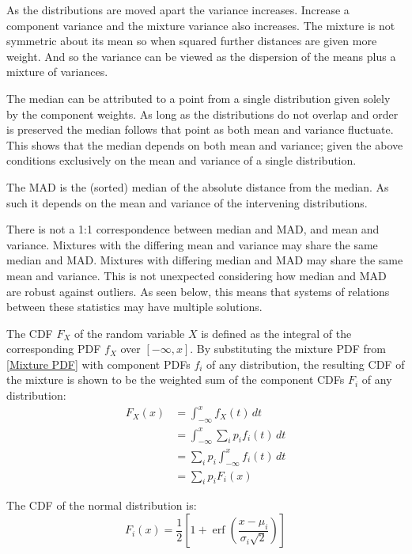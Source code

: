 \documentclass{article}
\DeclareMathOperator\erf{erf}
\begin{document}
As the distributions are moved apart the variance increases. Increase a component variance and the mixture variance also increases. The mixture is not symmetric about its mean so when squared further distances are given more weight. And so the variance can be viewed as the dispersion of the means plus a mixture of variances.

The median can be attributed to a point from a single distribution given solely by the component weights. As long as the distributions do not overlap and order is preserved the median follows that point as both mean and variance fluctuate. This shows that the median depends on both mean and variance; given the above conditions exclusively on the mean and variance of a single distribution.

The MAD is the (sorted) median of the absolute distance from the median. As such it depends on the mean and variance of the intervening distributions.

There is not a 1:1 correspondence between median and MAD, and mean and variance. Mixtures with the differing mean and variance may share the same median and MAD. Mixtures with differing median and MAD may share the same mean and variance. This is not unexpected considering how median and MAD are robust against outliers. As seen below, this means that systems of relations between these statistics may have multiple solutions.

The CDF $F_X$ of the random variable $X$ is defined as the integral of the corresponding PDF $f_X$ over $[-\infty,x]$. By substituting the mixture PDF from \ref{Mixture PDF} with component PDFs $f_i$ of any distribution, the resulting CDF of the mixture is shown to be the weighted sum of the component CDFs $F_i$ of any distribution:
%
\begin{equation}\label{Mixture CDF}
\begin{split}
F_X(x) & = \int_{-\infty}^{x} f_X(t) \,dt \\
& = \int_{-\infty}^{x} \sum_i p_i f_i(t) \,dt \\
& = \sum_i p_i \int_{-\infty}^{x} f_i(t) \,dt \\
& = \sum_i p_i F_i(x)
\end{split}
\end{equation}

The CDF of the normal distribution is:
%
\begin{equation}\label{Normal CDF}
F_i(x) =  \frac{1}{2}
    \left[ 1 + \erf \left( \frac{x - \mu_i}{\sigma_i\sqrt{2}} \right)\right]
\end{equation}
\end{document}
